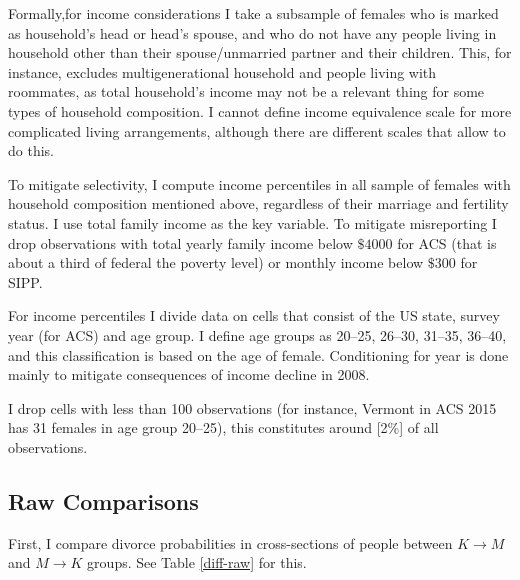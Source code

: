 \documentclass[12pt,letter]{article}
\begin{document}
Formally,for income considerations I take a subsample of females who is marked as household's head or head's spouse, and who do not have any people living in household other than their spouse/unmarried partner and their children. This, for instance, excludes multigenerational household and people living with roommates, as total household's income may not be a relevant thing for some types of household composition. I cannot define income equivalence scale for more complicated living arrangements, although there are different scales that allow to do this.

To mitigate selectivity, I compute income percentiles in all sample of females with household composition mentioned above, regardless of their marriage and fertility status. I use total family income as the key variable. To mitigate misreporting I drop observations with total yearly family income below $\$4000$ for ACS (that is about a third of federal the poverty level) or monthly income below $\$300$ for SIPP.

For income percentiles I divide data on cells that consist of the US state, survey year (for ACS) and age group. I define age groups as 20--25, 26--30, 31--35, 36--40, and this classification is based on the age of female. Conditioning for year is done mainly to mitigate consequences of income decline in 2008. 

I drop cells with less than 100 observations (for instance, Vermont in ACS 2015 has 31 females in age group 20--25), this constitutes around [2\%] of all observations. 

\subsection{Raw Comparisons}
First, I compare divorce probabilities in cross-sections of people between $K\to M$ and $M\to K$ groups. See Table \ref{diff-raw} for this.
\end{document}
